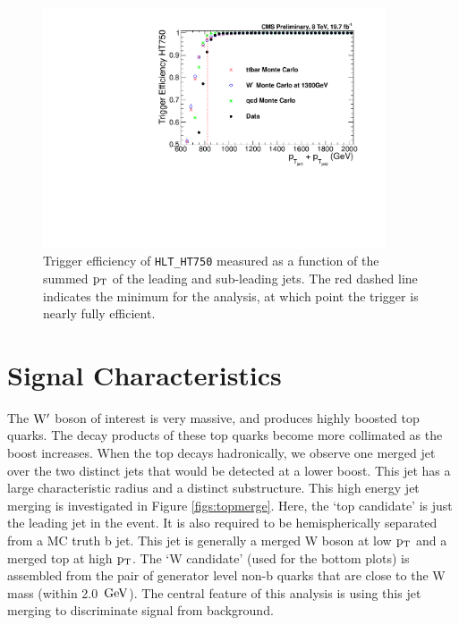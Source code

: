 \begin{figure}[htcb]
\centering
\includegraphics[width=0.9\textwidth]{AN-13-004/figs/Trigger_Comparison_Htdijet.pdf}
\caption{Trigger efficiency of \texttt{HLT\_HT750} measured as a function of the summed $\mathrm{p_{T}}$ of the leading and sub-leading jets.  The red dashed line indicates the minimum for the analysis, 
at which point the trigger is nearly fully efficient.}
\label{figs:Trigger_Comparison_Ht}
\end{figure}

\section{Signal Characteristics}
\label{sec:sigchar}
\label{sec:GenBptCut}
The $\mathrm{W}^\prime$ boson of interest is very massive, and produces highly boosted top quarks.  The decay products of these top quarks become more collimated as the boost 
increases.  When the top decays hadronically, we observe one merged jet over the two distinct jets that would be detected at a lower boost.  This jet has a 
large characteristic radius and a distinct substructure.  This high energy jet merging is investigated in Figure \ref{figs:topmerge}.  Here, the `top candidate' 
is just the leading jet in the event.  It is also required to be hemispherically separated from a MC truth b jet.  This jet is generally a merged W boson at low $\mathrm{p_{T}}$ and a merged top at high $\mathrm{p_{T}}$.
The `W candidate' (used for the bottom plots) is assembled from the pair of generator level non-b quarks that are close to the W mass (within 2.0~$\mathrm{GeV}$).  
The central feature of this analysis is using this jet merging to discriminate signal from background.

